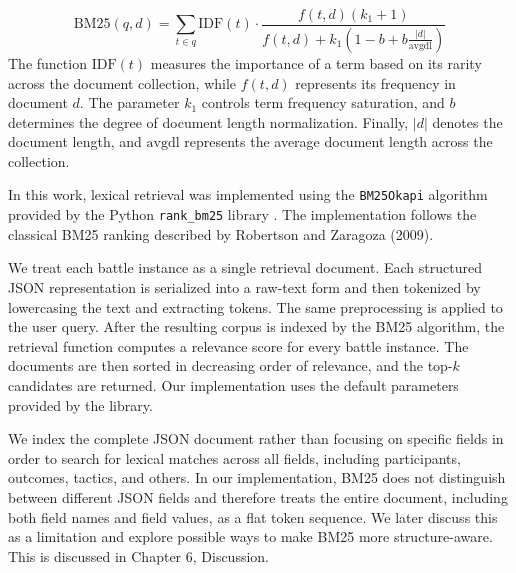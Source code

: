 \begin{equation}
    \mathrm{BM25}(q,d) =
    \sum_{t \in q} \mathrm{IDF}(t) \cdot
    \frac{f(t,d)(k_1+1)}
    {f(t,d)+k_1\left(1-b+b\frac{|d|}{\mathrm{avgdl}}\right)}
    \label{eq:bm25}
\end{equation}
The function $\mathrm{IDF}(t)$ measures the importance of a term based on its rarity across the document collection, while $f(t,d)$ represents its frequency in document $d$. The parameter $k_1$ controls term frequency saturation, and $b$ determines the degree of document length normalization. Finally, $|d|$ denotes the document length, and $\mathrm{avgdl}$ represents the average document length across the collection.

In this work, lexical retrieval was implemented using the \texttt{BM25Okapi} algorithm provided by the Python \texttt{rank\_bm25} library \citep{brown2020rankbm25}. The implementation follows the classical BM25 ranking described by Robertson and Zaragoza (2009).

We treat each battle instance as a single retrieval document. Each structured JSON representation is serialized into a raw-text form and then tokenized by lowercasing the text and extracting tokens. The same preprocessing is applied to the user query. After the resulting corpus is indexed by the BM25 algorithm, the retrieval function computes a relevance score for every battle instance. The documents are then sorted in decreasing order of relevance, and the top-$k$ candidates are returned. Our implementation uses the default parameters provided by the library.

We index the complete JSON document rather than focusing on specific fields in order to search for lexical matches across all fields, including participants, outcomes, tactics, and others. In our implementation, BM25 does not distinguish between different JSON fields and therefore treats the entire document, including both field names and field values, as a flat token sequence. We later discuss this as a limitation and explore possible ways to make BM25 more structure-aware. This is discussed in Chapter 6, Discussion.

